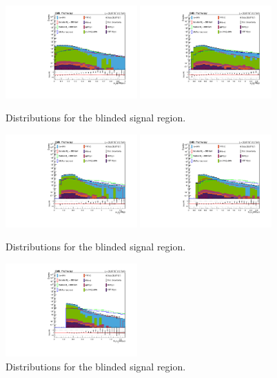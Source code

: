 \begin{figure}[thb]
  \centering
\includegraphics[width=0.45\textwidth]{figures/sec-control/LOG_jjptmjjgg.pdf}\hfil
\includegraphics[width=0.45\textwidth]{figures/sec-control/LOG_ljetptmgg}\hfil
  \caption{Distributions for the blinded signal region.}
\label{fig:cp_mgg5}
\end{figure}
\begin{figure}[thb]
  \centering
\includegraphics[width=0.45\textwidth]{figures/sec-control/LOG_sjetptmgg}\hfil
\includegraphics[width=0.45\textwidth]{figures/sec-control/LOG_lphoptmgg}\hfil
  \caption{Distributions for the blinded signal region.}
\label{fig:cp_mgg6}
\end{figure}
\begin{figure}[thb]
  \centering
\includegraphics[width=0.45\textwidth]{figures/sec-control/LOG_sphoptmgg}\hfil
  \caption{Distributions for the blinded signal region.}
\label{fig:cp_mgg7}
\end{figure}
